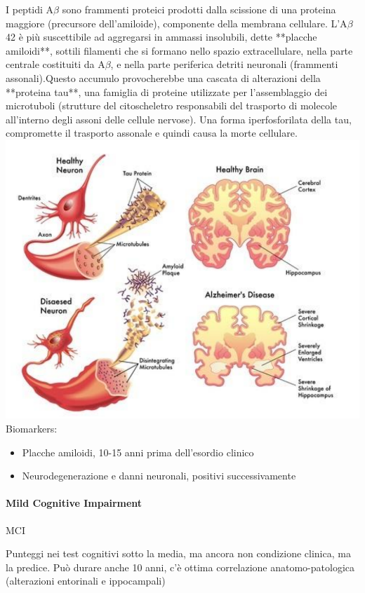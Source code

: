 \documentclass[12pt, a4paper]{article}
\begin{document}
I peptidi A$\beta$ sono frammenti proteici prodotti dalla scissione di una proteina maggiore (precursore dell'amiloide), componente della membrana cellulare. L'A$\beta$42 è più suscettibile ad aggregarsi in ammassi insolubili, dette **placche amiloidi**, sottili filamenti che si formano nello spazio extracellulare, nella parte centrale costituiti da A$\beta$, e nella parte periferica detri\-ti neuronali (frammenti assonali).Questo accumulo provocherebbe una casca\-ta di alterazioni
della **proteina tau**, una famiglia di proteine utiliz\-zate per l'assemblaggio dei microtuboli (strutture del citoscheletro responsa\-bili del trasporto di molecole all'interno  degli assoni delle cellule nervose). Una forma iperfosforilata della tau, compromette il trasporto assonale e quindi causa la morte cellulare.
\medskip\\
\includegraphics[width=\linewidth]{./images/image8}
\medskip\\
Biomarkers:
\begin{itemize}
    \item Placche amiloidi, 10-15 anni prima dell'esordio clinico
    \item Neurodegenerazione e danni neuronali, positivi successivamente
\end{itemize}
\paragraph{Mild Cognitive Impairment}  MCI 

Punteggi nei test cognitivi sotto la media, ma ancora non condizione clinica, ma la predice. Può durare anche 10 anni, c'è ottima correlazione anatomo-patologica (alterazioni entorinali e ippocampali)
\end{document}
